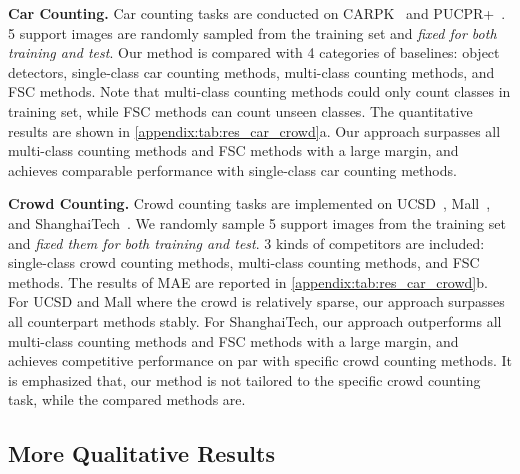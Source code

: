 \documentclass[10pt,twocolumn,letterpaper]{article}
\begin{document}
\vspace{2pt} \noindent \textbf{Car Counting.} Car counting tasks are conducted on CARPK~\cite{lpn} and PUCPR+~\cite{lpn}. 5 support images are randomly sampled from the training set and \textit{fixed for both training and test}. Our method is compared with 4 categories of baselines: object detectors, single-class car counting methods, multi-class counting methods, and FSC methods. Note that multi-class counting methods could only count classes in training set, while FSC methods can count unseen classes. The quantitative results are shown in \cref{appendix:tab:res_car_crowd}a. Our approach surpasses all multi-class counting methods and FSC methods with a large margin, and achieves comparable performance with single-class car counting methods. 

\vspace{2pt} \noindent \textbf{Crowd Counting.} Crowd counting tasks are implemented on UCSD~\cite{ucsd}, Mall~\cite{mall}, and ShanghaiTech~\cite{mcnn}. We randomly sample 5 support images from the training set and \textit{fixed them for both training and test}. 3 kinds of competitors are included: single-class crowd counting methods, multi-class counting methods, and FSC methods. The results of MAE are reported in \cref{appendix:tab:res_car_crowd}b. For UCSD and Mall where the crowd is relatively sparse, our approach surpasses all counterpart methods stably. For ShanghaiTech, our approach outperforms all multi-class counting methods and FSC methods with a large margin, and achieves competitive performance on par with specific crowd counting methods. It is emphasized that, our method is not tailored to the specific crowd counting task, while the compared methods are. 


\subsection{More Qualitative Results}
\end{document}
